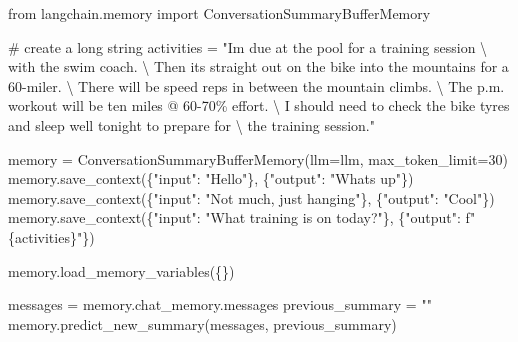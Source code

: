 \documentclass[
  letterpaper,
  DIV=11,
  numbers=noendperiod]{scrreprt}
\newenvironment{Shaded}{\begin{snugshade}}{\end{snugshade}}
\newcommand{\CharTok}[1]{\textcolor[rgb]{0.13,0.47,0.30}{#1}}
\newcommand{\CommentTok}[1]{\textcolor[rgb]{0.37,0.37,0.37}{#1}}
\newcommand{\DecValTok}[1]{\textcolor[rgb]{0.68,0.00,0.00}{#1}}
\newcommand{\ImportTok}[1]{\textcolor[rgb]{0.00,0.46,0.62}{#1}}
\newcommand{\NormalTok}[1]{\textcolor[rgb]{0.00,0.23,0.31}{#1}}
\newcommand{\OperatorTok}[1]{\textcolor[rgb]{0.37,0.37,0.37}{#1}}
\newcommand{\SpecialCharTok}[1]{\textcolor[rgb]{0.37,0.37,0.37}{#1}}
\newcommand{\SpecialStringTok}[1]{\textcolor[rgb]{0.13,0.47,0.30}{#1}}
\newcommand{\StringTok}[1]{\textcolor[rgb]{0.13,0.47,0.30}{#1}}
\begin{document}
\begin{Shaded}
\begin{Highlighting}[]
\ImportTok{from}\NormalTok{ langchain.memory }\ImportTok{import}\NormalTok{ ConversationSummaryBufferMemory}

\CommentTok{\# create a long string}
\NormalTok{activities }\OperatorTok{=} \StringTok{"I\textquotesingle{}m due at the pool for a training session }\CharTok{\textbackslash{}}
\StringTok{with the swim coach. }\CharTok{\textbackslash{}}
\StringTok{Then it\textquotesingle{}s straight out on the bike into the mountains for a 60{-}miler. }\CharTok{\textbackslash{}}
\StringTok{There will be speed reps in between the mountain climbs. }\CharTok{\textbackslash{}}
\StringTok{The p.m. workout will be ten miles @ 60{-}70}\SpecialCharTok{\% e}\StringTok{ffort. }\CharTok{\textbackslash{}}
\StringTok{I should need to check the bike tyres and sleep well tonight to prepare for }\CharTok{\textbackslash{}}
\StringTok{the training session."}

\NormalTok{memory }\OperatorTok{=}\NormalTok{ ConversationSummaryBufferMemory(llm}\OperatorTok{=}\NormalTok{llm, max\_token\_limit}\OperatorTok{=}\DecValTok{30}\NormalTok{)}
\NormalTok{memory.save\_context(\{}\StringTok{"input"}\NormalTok{: }\StringTok{"Hello"}\NormalTok{\}, \{}\StringTok{"output"}\NormalTok{: }\StringTok{"What\textquotesingle{}s up"}\NormalTok{\})}
\NormalTok{memory.save\_context(\{}\StringTok{"input"}\NormalTok{: }\StringTok{"Not much, just hanging"}\NormalTok{\},}
\NormalTok{                    \{}\StringTok{"output"}\NormalTok{: }\StringTok{"Cool"}\NormalTok{\})}
\NormalTok{memory.save\_context(\{}\StringTok{"input"}\NormalTok{: }\StringTok{"What training is on today?"}\NormalTok{\},}
\NormalTok{                    \{}\StringTok{"output"}\NormalTok{: }\SpecialStringTok{f"}\SpecialCharTok{\{}\NormalTok{activities}\SpecialCharTok{\}}\SpecialStringTok{"}\NormalTok{\})}
\end{Highlighting}
\end{Shaded}

\begin{Shaded}
\begin{Highlighting}[]
\NormalTok{memory.load\_memory\_variables(\{\})}
\end{Highlighting}
\end{Shaded}

\begin{Shaded}
\begin{Highlighting}[]
\NormalTok{messages }\OperatorTok{=}\NormalTok{ memory.chat\_memory.messages}
\NormalTok{previous\_summary }\OperatorTok{=} \StringTok{""}
\NormalTok{memory.predict\_new\_summary(messages, previous\_summary)}
\end{Highlighting}
\end{Shaded}
\end{document}
